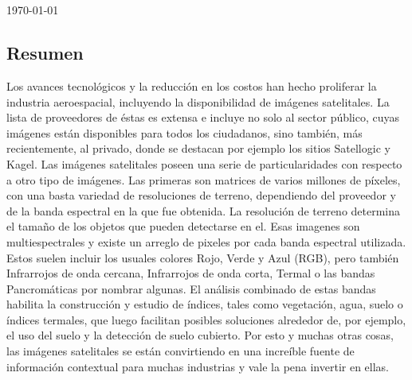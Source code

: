 \documentclass[11pt, oneside]{Thesis} %
\begin{document}
\begin{titlepage}
\begin{center}
\facname\\~\\ %
 
{\large \today}\\ %
\vfill
\end{center}
\end{titlepage}

\clearpage %

\pagebreak


\newpage
\vspace*{\fill}
\begin{center}
\section*{Resumen}
\end{center}
Los avances tecnológicos y la reducción en los costos han hecho proliferar la industria aeroespacial, incluyendo la disponibilidad de imágenes satelitales. La lista de proveedores de éstas es extensa e incluye no solo al sector público, cuyas imágenes están disponibles para todos los ciudadanos, sino también, más recientemente, al privado, donde se destacan por ejemplo los sitios Satellogic y Kagel.
Las imágenes satelitales poseen una serie de particularidades con respecto a otro tipo de imágenes. Las primeras son matrices de varios millones de píxeles, con una basta variedad de resoluciones de terreno, dependiendo del proveedor y de la banda espectral en la que fue obtenida. La resolución de terreno determina el tamaño de los objetos que pueden detectarse en el. Esas imagenes son multiespectrales y existe un arreglo de pixeles por cada banda espectral utilizada. Estos suelen incluir los usuales colores Rojo, Verde y Azul (RGB), pero también Infrarrojos de onda cercana, Infrarrojos de onda corta, Termal o las bandas Pancromáticas por nombrar algunas. El análisis combinado de estas bandas habilita la construcción y estudio de índices, tales como vegetación, agua, suelo o índices termales, que luego facilitan posibles soluciones alrededor de, por ejemplo, el uso del suelo y la detección de suelo cubierto. Por esto y muchas otras cosas, las imágenes satelitales se están convirtiendo en una increíble fuente de información contextual para muchas industrias y vale la pena invertir en ellas.
\end{document}
